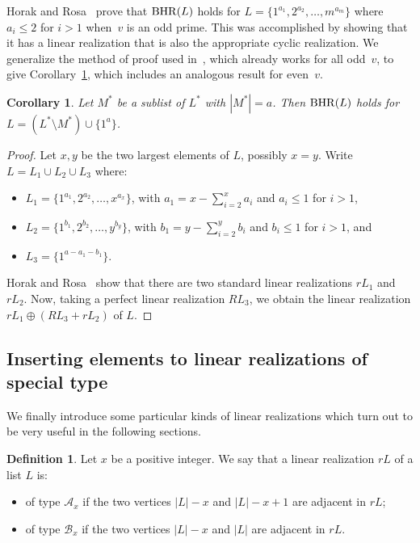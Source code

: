 \documentclass{amsart}
\newtheorem{cor}[prop]{Corollary}
\theoremstyle{definition}
\newtheorem{defi}[prop]{Definition}
\numberwithin{equation}{section}
\def\A{\mathcal{A}}
\def\B{\mathcal{B}}
\def\BHR{\mathop{\rm BHR}}
\def\ol{\oplus}
\begin{document}
Horak and Rosa~\cite[Theorem 3.1]{HR} prove that $\BHR(L)$ holds for
$L = \{ 1^{a_1}, 2^{a_2}, \ldots, m^{a_m} \}$ where $a_i \leq 2$ for $i >1$  when~$v$ is an odd prime.
This was accomplished by showing that it has a linear realization that is also the appropriate cyclic realization.
We generalize the method of proof used in~\cite{HR}, which already works for all odd~$v$, to give Corollary~\ref{cor:hr_big1},
which includes an analogous result for even~$v$.

\begin{cor}\label{cor:hr_big1}
Let $M^*$ be a sublist of $L^*$ with $|M^*| = a$.  Then $\BHR(L)$ holds for $L = (L^* \setminus M^*) \cup \{ 1^a \}$.
\end{cor}


\begin{proof}
Let $x,y$ be the two largest elements of $L$, possibly $x=y$. Write $L = L_1 \cup L_2 \cup L_3$ where:
\begin{itemize}
 \item $L_1 = \{ 1^{a_1}, 2^{a_2}, \ldots, x^{a_x} \}$, with $a_1 = x - \sum\limits_{i=2}^x a_i$ and $a_i \leq 1$ for $i>1$,
 \item $L_2 = \{ 1^{b_1}, 2^{b_2}, \ldots, y^{b_y} \}$, with $b_1 = y - \sum\limits_{i=2}^y b_i$ and $b_i \leq 1$ for $i>1$, and 
 \item $L_3 = \{ 1^{a - a_1 - b_1} \}$.
\end{itemize}

Horak and Rosa~\cite[Lemma~3.13]{HR} show that there are two standard linear realizations $rL_1$ and $rL_2$.
Now, taking a perfect linear realization $RL_3$, we obtain the linear realization $rL_1 \ol ( RL_3+ rL_2)$ of $L$.
\end{proof}




\subsection{Inserting elements to linear realizations of special type}

We finally introduce some particular kinds of linear realizations which turn out to be very useful in the
following sections.

\begin{defi}\label{def:AxBx}
Let $x$ be a positive integer. We say that a linear realization $rL$ of a list $L$ is:
\begin{itemize}
\item of type $\A_x$ if the two vertices $|L|-x$ and $|L|-x+1$ are adjacent in $rL$;
\item of type $\B_x$ if the two vertices $|L|-x$ and $|L|$  are adjacent in $rL$.
\end{itemize}
\end{defi}
\end{document}
